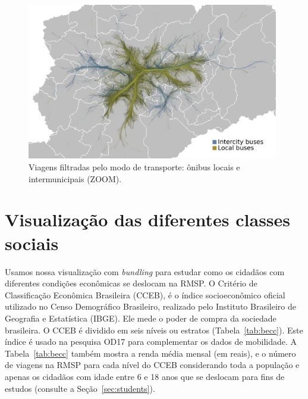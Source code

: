 \begin{figure}[!htb]
  \centering
  \captionsetup{justification=centering}
  \includegraphics[width=0.98\textwidth]{../figuras/local-intercity-buses}
  \caption{Viagens filtradas pelo modo de transporte: ônibus locais e intermunicipais (ZOOM). \label{fig:bus-integration-zoom}}
\end{figure}

\section{Visualização das diferentes classes sociais}
\label{sec:strata}


Usamos nossa visualização com \emph{bundling} para estudar como os cidadãos com diferentes
condições econômicas se deslocam na RMSP. O Critério de Classificação Econômica
Brasileira (CCEB), \cite{cceb2008} é o índice socioeconômico oficial utilizado no Censo
Demográfico Brasileiro, realizado pelo Instituto Brasileiro de Geografia e
Estatística (IBGE). Ele mede o poder de compra da sociedade brasileira. O CCEB é
dividido em seis níveis ou estratos (Tabela~\ref{tab:becc}). Este índice é usado na pesquisa
OD17 para complementar os dados de mobilidade. A Tabela~\ref{tab:becc} também mostra a renda
média mensal (em reais), e o número de viagens na RMSP para cada nível do CCEB considerando toda a população e apenas
os cidadãos com idade entre 6 e 18 anos que se deslocam para fins de estudos (consulte a
Seção~\ref{sec:students}).

